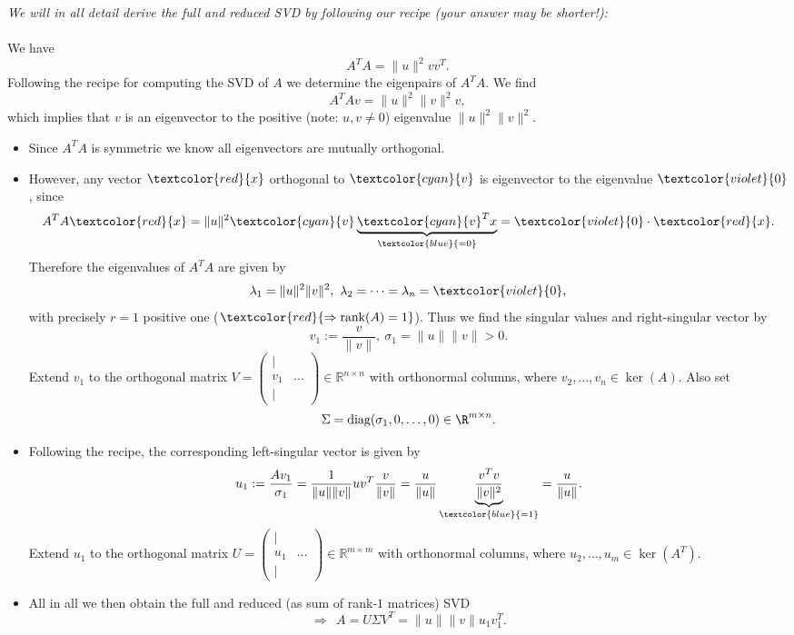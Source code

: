 {\color{solution}
\textit{We will in all detail derive the full and reduced SVD by following our recipe (your answer may be shorter!):	}~\\~\\
We have $$A^TA=\|u\|^2vv^T.$$
Following the recipe for computing the SVD of $A$ we determine the eigenpairs of $A^TA$. We find
$$A^TAv=\|u\|^2\|v\|^2v,$$
which implies that $v$ is an eigenvector to the positive (note: $u,v \neq 0$) eigenvalue $\|u\|^2\|v\|^2$.
\begin{itemize}
	\item 
	Since $A^TA$ is symmetric we know all eigenvectors are mutually orthogonal.
	\item 
	However, any vector $\textcolor{red}{x}$ orthogonal to $\textcolor{cyan}{v}$ is eigenvector to the eigenvalue $\textcolor{violet}{0}$, since $$A^TA\textcolor{red}{x}=\|u\|^2\textcolor{cyan}{v}\underbrace{\textcolor{cyan}{v}^Tx}_{\textcolor{blue}{=0}}=\textcolor{violet}{0}\cdot\textcolor{red}{x}.$$
	Therefore the eigenvalues of $A^TA$ are given by
	$$\lambda_1=\|u\|^2\|v\|^2,~\lambda_2=\dots=\lambda_n=\textcolor{violet}{0},$$
	with precisely $r=1$ positive one ($\textcolor{red}{\Rightarrow\text{rank}(A)=1}$).
	Thus we find the singular values and right-singular vector by
	$$v_1:=\frac{v}{\|v\|},~\sigma_1=\|u\|\|v\|>0.$$
		Extend $v_1$ to the orthogonal matrix $V=\begin{pmatrix}|& \\v_1&\dots\\|& \end{pmatrix}\in\mathbb{R}^{n\times n}$ with orthonormal columns, where $v_2,\ldots,v_n \in \ker(A)$.
		Also set $$\Sigma = \text{diag}(\sigma_1,0,\ldots, 0) \in \R^{m \times n}.$$
	\item 
	Following the recipe, the corresponding left-singular vector is given by  
	$$u_1 :=\frac{Av_1}{\sigma_1}=\frac{1}{\|u\|\|v\|}uv^T\frac{v}{\|v\|}=\frac{u}{\|u\|}\underbrace{\frac{v^Tv}{\|v\|^2}}_{\textcolor{blue}{=1}}=\frac{u}{\|u\|}.$$
	Extend $u_1$ to the orthogonal matrix $U=\begin{pmatrix}|& \\u_1&\dots\\|& \end{pmatrix}\in\mathbb{R}^{m\times m}$ with orthonormal columns, where $u_2,\ldots,u_m \in \ker(A^T)$.
	\item All in all we then obtain the full and reduced (as sum of rank-$1$ matrices) SVD
	$$
	\Rightarrow~~A= U\Sigma V^T = \|u\|\|v\|u_1v_1^T.
	$$
\end{itemize}

}